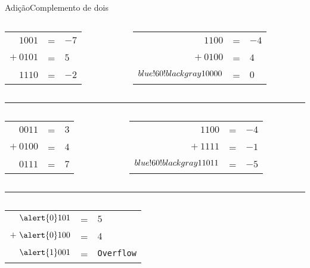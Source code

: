 \begin{frame}{Adição}{Complemento de dois}

\begin{columns}
\begin{column}{.3\textwidth}
  \begin{tabular}{rcl}
      $1001$ & = & $-7$ \\
      $+\ 0101$ & = & $5$ \\\hline
      $1110$ & = & $-2$ \\
     \end{tabular}
   \end{column}

\begin{column}{.3\textwidth}
  \begin{tabular}{rcl}
      $1100$ & = & $-4$ \\
      $+\ 0100$ & = & $4$ \\\hline
      ${blue!60!black{gray}1}0000$ & = & $0$ \\
     \end{tabular}
   \end{column}
 \end{columns}

\pause
\bigskip
{\color{gray}\hrule}
\bigskip
\begin{columns}
\begin{column}{.3\textwidth}
  \begin{tabular}{rcl}
      $0011$ & = & $3$ \\
      $+\ 0100$ & = & $4$ \\\hline
      $0111$ & = & $7$ \\
     \end{tabular}
   \end{column}

\begin{column}{.3\textwidth}
  \begin{tabular}{rcl}
      $1100$ & = & $-4$ \\
      $+\ 1111$ & = & $-1$ \\\hline
      ${blue!60!black{gray}1}1011$ & = & $-5$ \\
     \end{tabular}
   \end{column}

\end{columns}

\pause
\bigskip
{\color{gray}\hrule}
\bigskip
\begin{columns}
\begin{column}{.3\textwidth}
  \begin{tabular}{rcl}
      $\alert{0}101$ & = & $5$ \\
      $+\ \alert{0}100$ & = & $4$ \\\hline
      $\alert{1}001$ & = & \alert{\tt Overflow} \\
     \end{tabular}
   \end{column}


\end{columns}
\end{frame}
